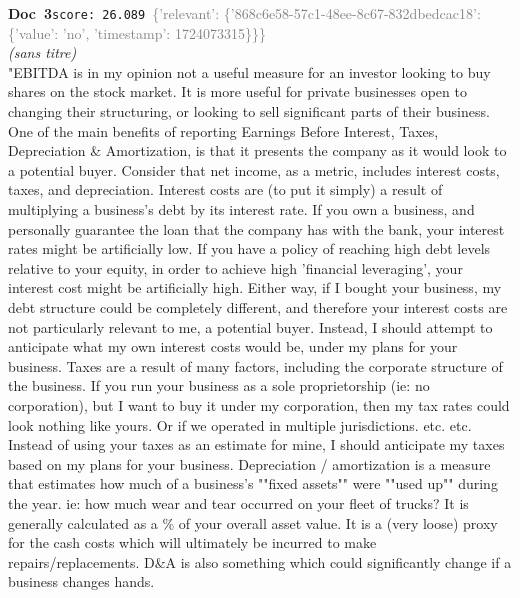 \documentclass[a4paper,11pt]{article}
\begin{document}
\begin{docenv}
{\footnotesize\textcolor{doccolor}{\textbf{Doc~3}}}\hfill{\tiny\texttt{score:~26.089}}\ {\tiny\textcolor{gray}{\{'relevant': \{'868c6e58-57c1-48ee-8c67-832dbedcac18': \{'value': 'no', 'timestamp': 1724073315\}\}\}}}\\[3pt]
{\small\textit{(sans titre)}}\\[2pt]
\vspace{2pt}
{\footnotesize 
"EBITDA is in my opinion not a useful measure for an investor looking to buy shares on the stock market. It is more useful for private businesses open to changing their structuring, or looking to sell significant parts of their business. One of the main benefits of reporting Earnings Before Interest, Taxes, Depreciation \& Amortization, is that it presents the company as it would look to a potential buyer. Consider that net income, as a metric, includes interest costs, taxes, and depreciation. Interest costs are (to put it simply) a result of multiplying a business's debt by its interest rate. If you own a business, and personally guarantee the loan that the company has with the bank, your interest rates might be artificially low. If you have a policy of reaching high debt levels relative to your equity, in order to achieve high 'financial leveraging', your interest cost might be artificially high. Either way, if I bought your business, my debt structure could be completely different, and therefore your interest costs are not particularly relevant to me, a potential buyer. Instead, I should attempt to anticipate what my own interest costs would be, under my plans for your business. Taxes are a result of many factors, including the corporate structure of the business. If you run your business as a sole proprietorship (ie: no corporation), but I want to buy it under my corporation, then my tax rates could look nothing like yours. Or if we operated in multiple jurisdictions. etc. etc. Instead of using your taxes as an estimate for mine, I should anticipate my taxes based on my plans for your business. Depreciation / amortization is a measure that estimates how much of a business's ""fixed assets"" were ""used up"" during the year. ie: how much wear and tear occurred on your fleet of trucks? It is generally calculated as a \% of your overall asset value. It is a (very loose) proxy for the cash costs which will ultimately be incurred to make repairs/replacements. D\&A is also something which could significantly change if a business changes hands.}
\end{docenv}
\end{document}
